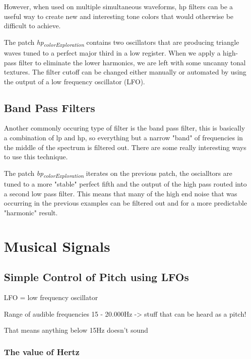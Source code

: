 \documentclass[11pt]{article}
\begin{document}
However, when used on multiple simultaneous waveforms, hp filters can
be a useful way to create new and interesting tone colors that would
otherwise be difficult to achieve. 

The patch \emph{hp\textsubscript{colorExploration}} contains two oscillators that are
producing triangle waves tuned to a perfect major third in a low
register. When we apply a high-pass filter to eliminate the lower
harmonics, we are left with some uncanny tonal textures. The filter
cutoff can be changed either manually or automated by using the output
of a low frequency oscillator (LFO).  

\subsection{Band Pass Filters}
\label{sec:orgbb6689f}
Another commonly occuring type of filter is the band pass filter, this
is basically a combination of lp and hp, so everything but a narrow
"band" of frequencies in the middle of the spectrum is filtered
out. There are some really interesting ways to use this technique. 

The patch \emph{bp\textsubscript{colorExploration}} iterates on the previous patch, the
oscialltors are tuned to a more "stable" perfect fifth and the output
of the high pass routed into a second low pass filter. This means that
many of the high end noise that was occurring in the previous examples
can be filtered out and for a more predictable "harmonic" result.





\section{Musical Signals}
\label{sec:orge12e175}
\subsection{Simple Control of Pitch using LFOs}
\label{sec:orgd3fdafc}
LFO = low frequency oscillator

Range of audible frequencies 15 - 20.000Hz -> stuff that can be heard
as a pitch!

That means anything below 15Hz doesn't sound

\subsubsection{The value of Hertz}
\label{sec:org7c0dab0}
\end{document}
